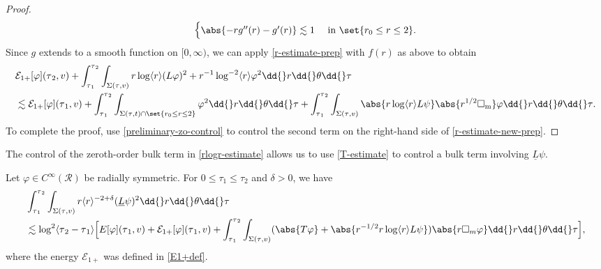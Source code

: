 \documentclass[10pt, reqno]{amsart}
\begin{document}
\begin{proof}
\begin{equation}
\begin{cases}
\abs{-rg''(r) - g'(r)}\lesssim 1&\textnormal{ in }\set{r_0\le r\le 2}. \\
\end{cases}
\end{equation}
Since \(g\) extends to a smooth function on \([0,\infty)\), we can apply
\cref{r-estimate-prep} with \(f(r)\) as above to obtain
\begin{equation}\label{r-estimate-new-prep}
\begin{split}
&\mathcal{E}_{1+}[\varphi{}](\tau{}_2,v) + \int_{\tau{}_1}^{\tau{}_2} \int _{\Sigma{}(\tau{},v)} r\log \langle{}r\rangle{}(L\varphi{})^2 + r^{-1}\log^{-2}\langle{}r\rangle{}\varphi^2\dd{}r\dd{}\theta{}\dd{}\tau{} \\
&\lesssim \mathcal{E}_{1+}[\varphi{}](\tau{}_1,v) + \int_{\tau{}_1}^{\tau{}_2} \int _{\Sigma{}(\tau{},t)\cap \set{r_0\le r\le 2}}\varphi^2\dd{}r\dd{}\theta{}\dd{}\tau{} + \int_{\tau{}_1}^{\tau{}_2}\int _{\Sigma{}(\tau{},v)} \abs{r\log \langle{}r\rangle{}L\psi{}}\abs{r^{1/2}\Box{}_{\textnormal{m}}}\varphi{}
\dd{}r\dd{}\theta{}\dd{}\tau{}.
\end{split}
\end{equation}
To complete the proof, use \cref{preliminary-zo-control} to control the second term
on the right-hand side of \cref{r-estimate-new-prep}.
\end{proof}
The control of the zeroth-order bulk term in \cref{rlogr-estimate} allows
us to use \cref{T-estimate} to control a bulk term involving \(\underline{L}\psi{}\).
\begin{corollary}
Let \(\varphi{}\in C^\infty(\mathcal{R})\) be radially symmetric. For \(0\le \tau_1\le \tau_2\) and \(\delta{} > 0\),
we have
\begin{equation}\label{Lbar-psi-bulk-estimate-equation}
\begin{split}
&\int_{\tau{}_1}^{\tau{}_2} \int _{\Sigma{}(\tau{},v)} r\langle{}r\rangle{}^{-2+\delta{}}(\underline{L}\psi{})^2\dd{}r\dd{}\theta{}\dd{}\tau{} \\
&\lesssim \log ^2\langle{}\tau{}_2-\tau{}_1\rangle{}\Bigl[E[\varphi{}](\tau{}_1,v) + \mathcal{E}_{1+}[\varphi{}](\tau{}_1,v)+ \int_{\tau{}_1}^{\tau{}_2} \int _{\Sigma{}(\tau{},v)} (\abs{T\varphi{}} +  \abs{r^{-1/2}r\log \langle{}r\rangle{}L\psi{}})\abs{r\Box{}_m\varphi{}} \dd{}r\dd{}\theta{}\dd{}\tau{}\Bigr],
\end{split}
\end{equation}
where the energy \(\mathcal{E}_{1 + }\) was defined in \cref{E1+def}.
\label{Lbar-psi-bulk-estimate}
\end{corollary}
\end{document}

